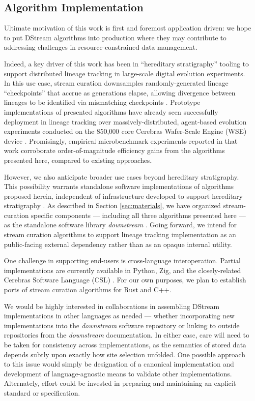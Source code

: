 \subsection{Algorithm Implementation}

Ultimate motivation of this work is first and foremost application driven: we hope to put DStream algorithms into production where they may contribute to addressing challenges in resource-constrained data management.

Indeed, a key driver of this work has been in ``hereditary stratigraphy'' tooling to support distributed lineage tracking in large-scale digital evolution experiments.
In this use case, stream curation downsamples randomly-generated lineage ``checkpoints'' that accrue as generations elapse, allowing divergence between lineages to be identified via mismatching checkpoints \citep{moreno2022hereditary}.
Prototype implementations of presented algorithms have already seen successfully deployment in lineage tracking over massively-distributed, agent-based evolution experiments conducted on the 850,000 core Cerebras Wafer-Scale Engine (WSE) device \citep{moreno2024trackable}.
Promisingly, empirical microbenchmark experiments reported in that work corroborate order-of-magnitude efficiency gains from the algorithms presented here, compared to existing approaches.

However, we also anticipate broader use cases beyond hereditary stratigraphy.
This possibility warrants standalone software implementations of algorithms proposed herein, independent of infrastructure developed to support hereditary stratigraphy \citep{moreno2022hstrat}.
As described in Section \ref{sec:materials}, we have organized stream-curation specific components --- including all three algorithms presented here --- as the standalone software library \textit{downstream} \citep{moreno2024downstream}.
Going forward, we intend for stream curation algorithms to support lineage tracking implementation as an public-facing external dependency rather than as an opaque internal utility.

One challenge in supporting end-users is cross-language interoperation.
Partial implementations are currently available in Python, Zig, and the closely-related Cerebras Software Language (CSL) \citep{moreno2024hsurf,moreno2024downstream,moreno2024wse}.
For our own purposes, we plan to establish ports of stream curation algorithms for Rust and C++.

We would be highly interested in collaborations in assembling DStream implementations in other languages as needed --- whether incorporating new implementations into the \textit{downstream} software repository or linking to outside repositories from the \textit{downstream} documentation.
In either case, care will need to be taken for consistency across implementations, as the semantics of stored data depends subtly upon exactly how site selection unfolded.
One possible approach to this issue would simply be designation of a canonical implementation and development of language-agnostic means to validate other implementations.
Alternately, effort could be invested in preparing and maintaining an explicit standard or specification.
